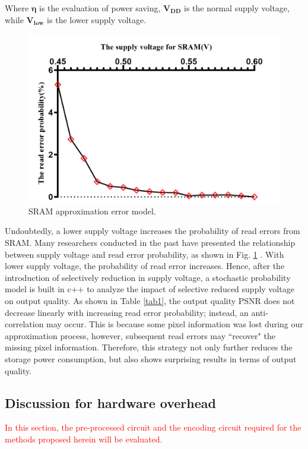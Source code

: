 \documentclass[lettersize,journal]{IEEEtran}
\begin{document}
Where $\boldsymbol{\eta}$  is the evaluation of power saving, $\boldsymbol{V_{DD}}$ is the normal supply voltage, while $\boldsymbol{V_{low}}$ is the lower supply voltage.
\begin{figure}[htb]
\centering
\includegraphics[width=\linewidth]{Fig/SRAM approximation error model.png}
\caption{SRAM approximation error model.}
\label{fig12}
\end{figure}

Undoubtedly, a lower supply voltage increases the probability of read errors from SRAM. Many researchers conducted in the past have presented the relationship between supply voltage and read error probability, as shown in Fig. \ref{fig12} \cite{9371622}. With lower supply voltage, the probability of read error increases. Hence, after the introduction of selectively reduction in supply voltage, a stochastic probability model is built in c++ to analyze the impact of selective reduced supply voltage on output quality. As shown in Table \ref{tab1}, the output quality PSNR does not decrease linearly with increasing read error probability; instead, an anti-correlation may occur. This is because some pixel information was lost during our approximation process, however, subsequent read errors may ``recover" the missing pixel information. Therefore, this strategy not only further reduces the storage power consumption, but also shows surprising results in terms of output quality.

{\color{red}\subsection{Discussion for hardware overhead}}
\textcolor{red}{In this section, the pre-processed circuit and the encoding circuit required for the methods proposed herein will be evaluated.} 
\end{document}
